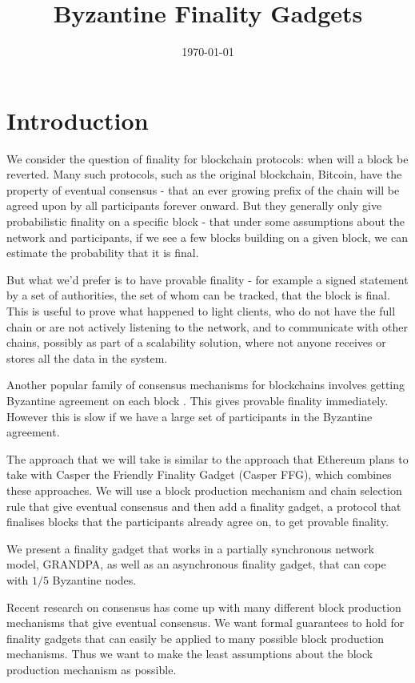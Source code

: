 \documentclass{article}
\begin{document}
\title{Byzantine Finality Gadgets}
\date{\today}
\maketitle

\section{Introduction}

We consider the question of finality for blockchain protocols: when will a block be reverted. Many such protocols, such as the original blockchain, Bitcoin, have the property of eventual consensus - that an ever growing prefix of the chain will be agreed upon by all participants forever onward.
But they generally only give probabilistic finality on a specific block - that under some assumptions about the network and participants, if we see a few blocks building on a given block, we can estimate the probability that it is final.

But what we'd prefer is to have provable finality - for example a signed statement by a set of authorities, the set of whom can be tracked, that the block is final.
This is useful to prove what happened to light clients, who do not have the full chain or are not actively listening to the network, and to communicate with other chains, possibly as part of a scalability solution, where not anyone receives or stores all the data in the system. 

Another popular family of consensus mechanisms for blockchains involves getting Byzantine agreement on each block \cite{Tendermint.AlgorandAgreement}.
This gives provable finality immediately. However this is slow if we have a large set of participants in the Byzantine agreement.

The approach that we will take is similar to the approach that Ethereum plans to take with Casper the Friendly Finality Gadget (Casper FFG)\cite{CasperFFG}, which combines these approaches.
We will use a block production mechanism and chain selection rule that give eventual consensus and then add a finality gadget, a protocol that finalises blocks that the participants already agree on, to get provable finality.

We present a finality gadget that works in a partially synchronous network model, GRANDPA, as well as an asynchronous finality gadget, that can cope with $1/5$ Byzantine nodes. 

Recent research on consensus has come up with many different block production mechanisms that give eventual consensus. We want formal guarantees to hold for finality gadgets that can easily be applied to many possible block production mechanisms. Thus we want to make the least assumptions about the block production mechanism as possible.
\end{document}
